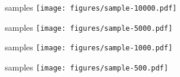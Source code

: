 \begin{frame}
    \begin{figure}
         samples
        \texttt{[image: figures/sample-10000.pdf]}
    \end{figure}
\end{frame}

\begin{frame}
    \begin{figure}
         samples
        \texttt{[image: figures/sample-5000.pdf]}
    \end{figure}
\end{frame}

\begin{frame}
    \begin{figure}
         samples
        \texttt{[image: figures/sample-1000.pdf]}
    \end{figure}
\end{frame}

\begin{frame}
    \begin{figure}
         samples
        \texttt{[image: figures/sample-500.pdf]}
    \end{figure}
\end{frame}